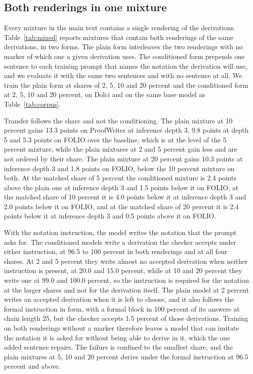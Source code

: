 

\subsection{Both renderings in one mixture}
\label{sec:mixed-table}

Every mixture in the main text contains a single rendering of the derivations.
Table~\ref{tab:mixed} reports mixtures that contain both renderings of the same
derivations, in two forms. The plain form interleaves the two renderings with
no marker of which one a given derivation uses. The conditioned form prepends
one sentence to each training prompt that names the notation the derivation
will use, and we evaluate it with the same two sentences and with no sentence
at all. We train the plain form at shares of 2, 5, 10 and 20 percent and the
conditioned form at 2, 5, 10 and 20 percent, on Dolci and on the same base model as
Table~\ref{tab:corpus}.

Transfer follows the share and not the conditioning. The plain mixture at 10
percent gains 13.3 points on ProofWriter at inference depth 3, 9.8 points at
depth 5 and 5.3 points on FOLIO over the baseline, which is at the level of the
5 percent \formal{} mixture, while the plain mixtures at 2 and 5 percent gain
less and are not ordered by their share. The plain mixture at 20 percent gains
10.3 points at inference depth 3 and 1.8 points on FOLIO, below the 10 percent
mixture on both. At the matched share of 5 percent the conditioned mixture is
2.4 points above the plain one at inference depth 3 and 1.5 points below it on
FOLIO, at the matched share of 10 percent it is 4.0 points below it at
inference depth 3 and 2.0 points below it on FOLIO, and at the matched share of
20 percent it is 2.4 points below it at inference depth 3 and 0.5 points above
it on FOLIO.

With the notation instruction, the model writes the notation that the
prompt asks for. The conditioned models write a derivation the checker accepts under either instruction, at 96.5 to
100 percent in both renderings and at all four shares. At 2 and 5 percent
they write almost no accepted derivation when neither instruction is present,
at 20.0 and 15.0 percent, while at 10 and 20 percent they write one at 99.0 and
100.0 percent, so the instruction is required for the notation at the larger
shares and not for the derivation itself. The plain model at 2 percent writes an accepted derivation when it is
left to choose, and it also follows the formal instruction in form, with a
formal block in 100 percent of its answers at chain length 25, but the checker
accepts 1.5 percent of those derivations. Training on both renderings without a
marker therefore leaves a model that can imitate the notation it is asked for
without being able to derive in it, which the one added sentence repairs. The
failure is confined to the smallest share, and the plain mixtures at 5, 10 and
20 percent derive under the formal instruction at 96.5 percent and above.


